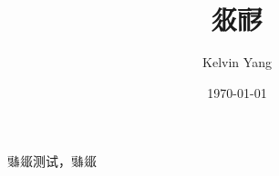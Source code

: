 \documentclass[12pt]{nextbook}
\title{𗼇𗟲}
\author{Kelvin Yang}
\date{\today}
\begin{document}
\frontmatter
\maketitle
\tableofcontents
\mainmatter
𘚜𗧻测试，𘚜𗧻
\end{document}
